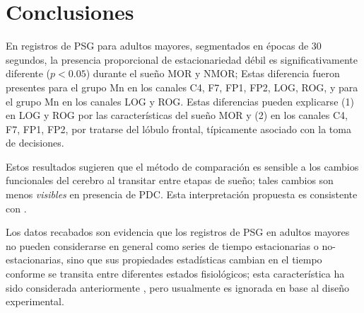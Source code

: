 
\section{Conclusiones}

En registros de PSG para adultos mayores, segmentados en épocas de 30 segundos, la presencia 
proporcional de estacionariedad débil es significativamente diferente ($p<0.05$) durante el sueño 
MOR y NMOR;
Estas diferencia fueron presentes para el grupo Mn en los canales C4, F7, FP1, FP2, LOG, ROG, y 
para el grupo Mn en los canales LOG y ROG.
Estas diferencias pueden explicarse 
(1) en LOG y ROG por las características del sueño MOR y
(2) en los canales C4, F7, FP1, FP2, por tratarse del lóbulo frontal, típicamente asociado con la 
toma de decisiones.


Estos resultados sugieren que el método de comparación es sensible a los cambios funcionales del 
cerebro al transitar entre etapas de sueño; tales cambios son menos \textit{visibles} en presencia
de PDC. Esta interpretación propuesta es consistente con \cite{Valeria}.


Los datos recabados son evidencia que los registros de PSG en adultos mayores no pueden 
considerarse en general como series de tiempo estacionarias o no-estacionarias, sino que sus 
propiedades estadísticas cambian en el tiempo conforme se transita entre diferentes estados 
fisiológicos; 
esta característica ha sido considerada anteriormente \cite{Kaiser00}, pero usualmente es ignorada
en base al diseño experimental.


